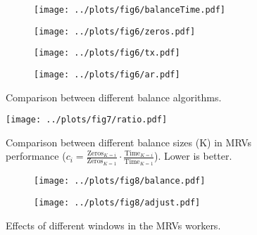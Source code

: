 \documentclass[border=2cm]{standalone}
\begin{document}
\begin{minipage}{17cm}
\vspace{1cm}

\begin{figure}[h]
    \centering
    \begin{subfigure}{.35\linewidth}
        \centering
        \texttt{[image: ../plots/fig6/balanceTime.pdf]}
    \end{subfigure}
    \begin{subfigure}{.35\linewidth}
        \centering
        \texttt{[image: ../plots/fig6/zeros.pdf]}
    \end{subfigure}
    \begin{subfigure}{.35\linewidth}
        \centering
        \texttt{[image: ../plots/fig6/tx.pdf]}
    \end{subfigure}
    \begin{subfigure}{.35\linewidth}
        \centering
        \texttt{[image: ../plots/fig6/ar.pdf]}
    \end{subfigure}
    \caption{Comparison between different balance algorithms.}
\end{figure}

\vspace{1cm}

\begin{figure}[h]
	\centering
	\texttt{[image: ../plots/fig7/ratio.pdf]}
	\caption{Comparison between different balance sizes (K) in MRVs performance ($c_i = \frac{\text{Zeros}_{K=i}}{\text{Zeros}_{K=1}} \cdot \frac{\text{Time}_{K=i}}{\text{Time}_{K=1}}$). \small \normalfont Lower is better.}
\end{figure}

\vspace{1cm}

\begin{figure}[h]
	\centering
	\begin{subfigure}{.35\linewidth}
		\centering
		\texttt{[image: ../plots/fig8/balance.pdf]}
	\end{subfigure}
	\begin{subfigure}{.35\linewidth}
		\centering
		\texttt{[image: ../plots/fig8/adjust.pdf]}
	\end{subfigure}
	\caption{Effects of different windows in the MRVs workers.}
\end{figure}


\end{minipage}
\end{document}
